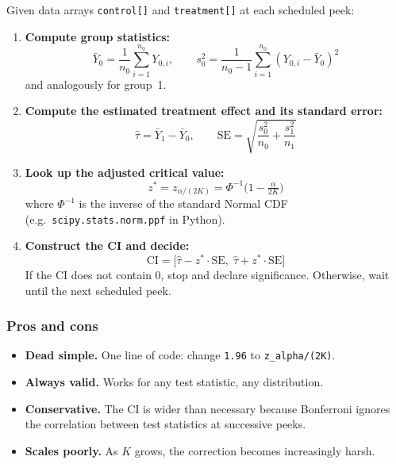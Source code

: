 \documentclass[12pt, a4paper]{article}
\begin{document}
Given data arrays \texttt{control[]} and \texttt{treatment[]} at each
scheduled peek:

\begin{enumerate}
  \item \textbf{Compute group statistics:}
  \[
    \bar{Y}_0 = \frac{1}{n_0}\sum_{i=1}^{n_0} Y_{0,i}, \qquad
    s_0^2 = \frac{1}{n_0 - 1}\sum_{i=1}^{n_0}(Y_{0,i} - \bar{Y}_0)^2
  \]
  and analogously for group~1.

  \item \textbf{Compute the estimated treatment effect and its standard
        error:}
  \[
    \hat{\tau} = \bar{Y}_1 - \bar{Y}_0, \qquad
    \text{SE} = \sqrt{\frac{s_0^2}{n_0} + \frac{s_1^2}{n_1}}
  \]

  \item \textbf{Look up the adjusted critical value:}
  \[
    z^* = z_{\alpha/(2K)} = \Phi^{-1}\!\bigl(1 - \tfrac{\alpha}{2K}\bigr)
  \]
  where $\Phi^{-1}$ is the inverse of the standard Normal CDF 
  (e.g.\ \texttt{scipy.stats.norm.ppf} in Python).

  \item \textbf{Construct the CI and decide:}
  \[
    \text{CI} = \bigl[\hat{\tau} - z^* \cdot \text{SE},\;
                       \hat{\tau} + z^* \cdot \text{SE}\bigr]
  \]
  If the CI does not contain 0, stop and declare significance.
  Otherwise, wait until the next scheduled peek.
\end{enumerate}

\subsubsection*{Pros and cons}

\begin{itemize}[nosep]
  \item[\textcolor{green!60!black}{+}] \textbf{Dead simple.}  One line of
        code: change \texttt{1.96} to \texttt{z\_alpha/(2K)}.
  \item[\textcolor{green!60!black}{+}] \textbf{Always valid.}  Works for
        any test statistic, any distribution.
  \item[\textcolor{red}{--}] \textbf{Conservative.}  The CI is wider than
        necessary because Bonferroni ignores the correlation between test
        statistics at successive peeks.
  \item[\textcolor{red}{--}] \textbf{Scales poorly.}  As $K$ grows, the
        correction becomes increasingly harsh.
\end{itemize}
\end{document}
